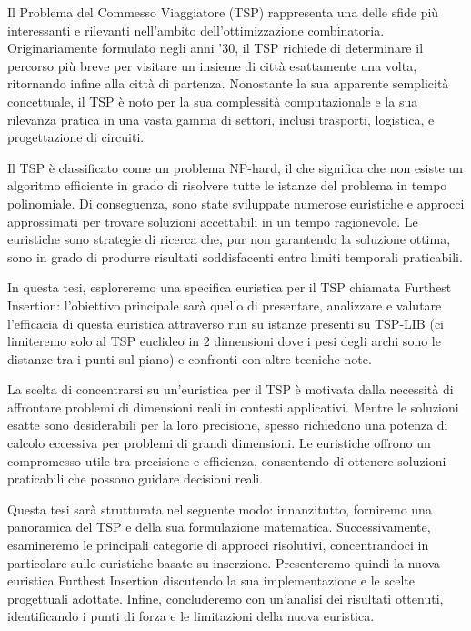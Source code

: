 \documentclass[a4paper,12pt]{report}
\begin{document}
\clearpage
\null
\thispagestyle{empty}
\clearpage

Il Problema del Commesso Viaggiatore (TSP) rappresenta una delle sfide più interessanti e rilevanti nell'ambito dell'ottimizzazione combinatoria. Originariamente formulato negli anni '30, il TSP richiede di determinare il percorso più breve per visitare un insieme di città esattamente una volta, ritornando infine alla città di partenza. Nonostante la sua apparente semplicità concettuale, il TSP è noto per la sua complessità computazionale e la sua rilevanza pratica in una vasta gamma di settori, inclusi trasporti,  logistica, e progettazione di circuiti.

Il TSP è classificato come un problema NP-hard, il che significa che non esiste un algoritmo efficiente in grado di risolvere tutte le istanze del problema in tempo polinomiale. Di conseguenza, sono state sviluppate numerose euristiche e approcci approssimati per trovare soluzioni accettabili in un tempo ragionevole. Le euristiche sono strategie di ricerca che, pur non garantendo la soluzione ottima, sono in grado di produrre risultati soddisfacenti entro limiti temporali praticabili.

In questa tesi, esploreremo una specifica euristica per il TSP chiamata Furthest Insertion: l'obiettivo principale sarà quello di presentare, analizzare e valutare l'efficacia di questa euristica attraverso run su istanze presenti su TSP-LIB (ci limiteremo solo al TSP euclideo in 2 dimensioni dove i pesi degli archi sono le distanze tra i punti sul piano) e confronti con altre tecniche note.

La scelta di concentrarsi su un'euristica per il TSP è motivata dalla necessità di affrontare problemi di dimensioni reali in contesti applicativi. Mentre le soluzioni esatte sono desiderabili per la loro precisione, spesso richiedono una potenza di calcolo eccessiva per problemi di grandi dimensioni. Le euristiche offrono un compromesso utile tra precisione e efficienza, consentendo di ottenere soluzioni praticabili che possono guidare decisioni reali.

Questa tesi sarà strutturata nel seguente modo: innanzitutto, forniremo una panoramica del TSP e della sua formulazione matematica. Successivamente, esamineremo le principali categorie di approcci risolutivi, concentrandoci in particolare sulle euristiche basate su inserzione. Presenteremo quindi la nuova euristica Furthest Insertion discutendo la sua implementazione e le scelte progettuali adottate. Infine, concluderemo con un'analisi dei risultati ottenuti, identificando i punti di forza e le limitazioni della nuova euristica.
\end{document}
